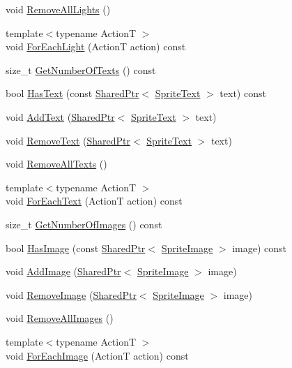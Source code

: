 \begin{DoxyCompactItemize}
void \hyperlink{classmage_1_1_world_a5fafe529414d511e88b98ccd8e2f951f}{Remove\+All\+Lights} ()
\item 
{\footnotesize template$<$typename ActionT $>$ }\\void \hyperlink{classmage_1_1_world_a7f6e04d24be88ae3126021d1b935ef72}{For\+Each\+Light} (ActionT action) const
\item 
size\+\_\+t \hyperlink{classmage_1_1_world_af905e4f753a0cb397425f2dc40256e52}{Get\+Number\+Of\+Texts} () const
\item 
bool \hyperlink{classmage_1_1_world_a3da4356b76c0c8fe7d1fd99ebf000e74}{Has\+Text} (const \hyperlink{namespacemage_a1e01ae66713838a7a67d30e44c67703e}{Shared\+Ptr}$<$ \hyperlink{classmage_1_1_sprite_text}{Sprite\+Text} $>$ text) const
\item 
void \hyperlink{classmage_1_1_world_a30921162ddd11eb69f96f1266de581a9}{Add\+Text} (\hyperlink{namespacemage_a1e01ae66713838a7a67d30e44c67703e}{Shared\+Ptr}$<$ \hyperlink{classmage_1_1_sprite_text}{Sprite\+Text} $>$ text)
\item 
void \hyperlink{classmage_1_1_world_a5ae17dc1e2f8cc668a1a519430d409af}{Remove\+Text} (\hyperlink{namespacemage_a1e01ae66713838a7a67d30e44c67703e}{Shared\+Ptr}$<$ \hyperlink{classmage_1_1_sprite_text}{Sprite\+Text} $>$ text)
\item 
void \hyperlink{classmage_1_1_world_a0d7742430969d01869a609e75bcf2bec}{Remove\+All\+Texts} ()
\item 
{\footnotesize template$<$typename ActionT $>$ }\\void \hyperlink{classmage_1_1_world_a55cad8c75836c4639929a153cdf0d3b4}{For\+Each\+Text} (ActionT action) const
\item 
size\+\_\+t \hyperlink{classmage_1_1_world_a3bf269d64b5cf04264e983f41b94223c}{Get\+Number\+Of\+Images} () const
\item 
bool \hyperlink{classmage_1_1_world_a54991358a01f0598ff11fd7a8a126897}{Has\+Image} (const \hyperlink{namespacemage_a1e01ae66713838a7a67d30e44c67703e}{Shared\+Ptr}$<$ \hyperlink{classmage_1_1_sprite_image}{Sprite\+Image} $>$ image) const
\item 
void \hyperlink{classmage_1_1_world_a06eff1a6d063c8ae067ab81de4f1b555}{Add\+Image} (\hyperlink{namespacemage_a1e01ae66713838a7a67d30e44c67703e}{Shared\+Ptr}$<$ \hyperlink{classmage_1_1_sprite_image}{Sprite\+Image} $>$ image)
\item 
void \hyperlink{classmage_1_1_world_ada3c4f1d16e676ee1c49e630d503a8e8}{Remove\+Image} (\hyperlink{namespacemage_a1e01ae66713838a7a67d30e44c67703e}{Shared\+Ptr}$<$ \hyperlink{classmage_1_1_sprite_image}{Sprite\+Image} $>$ image)
\item 
void \hyperlink{classmage_1_1_world_a8ff9f249e181af83c052bf8ec80ec0c7}{Remove\+All\+Images} ()
\item 
{\footnotesize template$<$typename ActionT $>$ }\\void \hyperlink{classmage_1_1_world_aa9438ba6ed5b7f10b04745d9277b397c}{For\+Each\+Image} (ActionT action) const
\end{DoxyCompactItemize}
